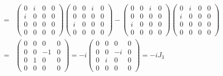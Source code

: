 \documentclass[11pt]{article}
\begin{document}
\section{ }
\begin{eqnarray}
    [k_1,k_2]&=&
    \begin{pmatrix}
        0 & i & 0 & 0\\ 
        i & 0 & 0 & 0 \\
        0 & 0 & 0 & 0 \\
        0 & 0 & 0 & 0 
    \end{pmatrix}
    \begin{pmatrix}
        0 & 0 & i & 0\\ 
        0 & 0 & 0 & 0 \\
        i & 0 & 0 & 0 \\
        0 & 0 & 0 & 0
    \end{pmatrix}
    -
    \begin{pmatrix}
        0 & 0 & i & 0\\ 
        0 & 0 & 0 & 0 \\
        i & 0 & 0 & 0 \\
        0 & 0 & 0 & 0
    \end{pmatrix}
    \begin{pmatrix}
        0 & i & 0 & 0\\ 
        i & 0 & 0 & 0 \\
        0 & 0 & 0 & 0 \\
        0 & 0 & 0 & 0 
    \end{pmatrix}\\
    &=&
    \begin{pmatrix}
        0 & 0 & 0 & 0\\
        0 & 0 & -1 & 0\\
        0 & 1 & 0 & 0\\
        0 & 0 & 0 & 0
    \end{pmatrix}
    =-i
    \begin{pmatrix}
        0 & 0 & 0 & 0 \\
        0 & 0 & -i & 0 \\
        0 & i & 0 & 0 \\
        0 & 0 & 0 & 0 
    \end{pmatrix}
    =-iJ_3 
\end{eqnarray}
\end{document}
